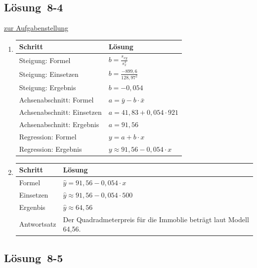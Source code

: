 \documentclass[
  11pt,
  ngerman,
  a4paper,
]{report}
\begin{document}
\hypertarget{loesung-8-4}{%
\subsection{Lösung~8-4}\label{loesung-8-4}}

\protect\hyperlink{aufgabe-8-4}{zur Aufgabenstellung}

\begin{enumerate}
\def\labelenumi{\alph{enumi})}
\item
  \begin{table}[H]
    \centering
    \begin{tabular}{ll}
    \toprule
    \textbf{Schritt} & \textbf{Lösung}\\
    \midrule
    Steigung: Formel & $b=\frac{s_{xy}}{s^2_x}$\\
    Steigung: Einsetzen & $b=\frac{-899{,}6}{128{,}97^2}$\\
    Steigung: Ergebnis & $b=-0{,}054$\\
    Achsenabschnitt: Formel & $a=\bar{y}-b\cdot\bar{x}$\\
    Achsenabschnitt: Einsetzen & $a=41{,}83+0{,}054\cdot921$\\
    Achsenabschnitt: Ergebnis & $a=91{,}56$\\
    Regression: Formel & $y=a + b \cdot x$\\
    Regression: Ergebnis & $y \approx 91{,}56 -0{,}054 \cdot x$\\
    \bottomrule
    \end{tabular}
    \end{table}
\item
  \begin{table}[H]
    \centering
    \begin{tabular}{ll}
    \toprule
    \textbf{Schritt} & \textbf{Lösung}\\
    \midrule
    Formel & $\hat{y}= 91{,}56 -0{,}054 \cdot x$\\
    Einsetzen & $\hat{y}\approx 91{,}56 -0{,}054 \cdot 500$\\
    Ergenbis & $\hat{y}\approx64{,}56$\\
    Antwortsatz & Der Quadradmeterpreis für die Immoblie beträgt laut Modell 64,56.\\
    \bottomrule
    \end{tabular}
    \end{table}
\end{enumerate}

\hypertarget{loesung-8-5}{%
\subsection{Lösung~8-5}\label{loesung-8-5}}
\end{document}
